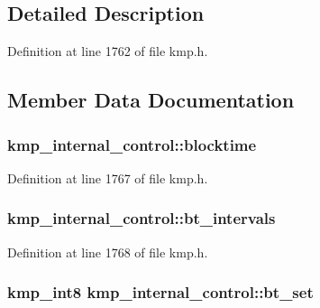 \subsection{Detailed Description}


Definition at line 1762 of file kmp.\-h.



\subsection{Member Data Documentation}
\hypertarget{structkmp__internal__control_a8528f85a03edae1a87d0ee4c7b36c4f4}{
\subsubsection[{blocktime}]{ kmp\-\_\-internal\-\_\-control\-::blocktime}}\label{structkmp__internal__control_a8528f85a03edae1a87d0ee4c7b36c4f4}


Definition at line 1767 of file kmp.\-h.

\hypertarget{structkmp__internal__control_aef086c2ffe180b307a02488ca85a18ce}{
\subsubsection[{bt\-\_\-intervals}]{ kmp\-\_\-internal\-\_\-control\-::bt\-\_\-intervals}}\label{structkmp__internal__control_aef086c2ffe180b307a02488ca85a18ce}


Definition at line 1768 of file kmp.\-h.

\hypertarget{structkmp__internal__control_ad68ef2c72320d0d153cefa83fc6a1bec}{
\subsubsection[{bt\-\_\-set}]{\setlength{\rightskip}{0pt plus 5cm}kmp\-\_\-int8 kmp\-\_\-internal\-\_\-control\-::bt\-\_\-set}}\label{structkmp__internal__control_ad68ef2c72320d0d153cefa83fc6a1bec}


